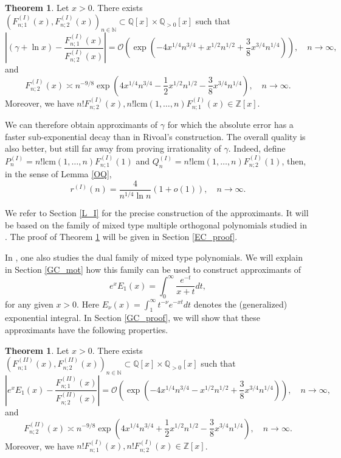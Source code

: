 \documentclass[a4paper,12pt,oneside]{article}
\theoremstyle{definition}
\newtheorem{thm}[defi]{Theorem} %
\newcommand{\N}{\mathbb{N}}
\newcommand{\Z}{\mathbb{Z}}
\newcommand{\Q}{\mathbb{Q}}
\newcommand{\BO}{\mathcal{O}}
\begin{document}
\begin{thm} \label{Res_EC}
    Let $x>0$. There exists $(F_{n;1}^{(I)}(x),F_{n;2}^{(I)}(x))_{n\in\N} \subset \Q[x]\times\Q_{>0}[x]$ such that
        $$ \left| (\gamma + \ln x) - \frac{F_{n;1}^{(I)}(x)}{F_{n;2}^{(I)}(x)}\right| = \BO (\exp(-4x^{1/4}n^{3/4} + x^{1/2} n^{1/2} + \frac{3}{8} x^{3/4} n^{1/4})),\quad n\to\infty, $$
    and 
        $$F_{n;2}^{(I)}(x) \asymp n^{-9/8} \exp(4x^{1/4}n^{3/4} - \frac{1}{2} x^{1/2}n^{1/2} - \frac{3}{8} x^{3/4} n^{1/4}),\quad n\to\infty.$$
    Moreover, we have $n! F_{n;2}^{(I)}(x), n!\text{lcm}(1,\dots,n) F_{n;1}^{(I)}(x)\in\Z[x] $.
\end{thm}

We can therefore obtain approximants of $\gamma$ for which the absolute error has a faster sub-exponential decay than in Rivoal's construction. The overall quality is also better, but still far away from proving irrationality of $\gamma$. Indeed, define $P_n^{(I)}=n!\text{lcm}(1,\dots,n) F_{n;1}^{(I)}(1)$ and $Q_n^{(I)} =n!\text{lcm}(1,\dots,n) F_{n;2}^{(I)}(1) $, then, in the sense of Lemma \ref{OQ},
    $$ r^{(I)}(n) = \frac{4}{n^{1/4}\ln n} (1+o(1)),\quad n\to\infty. $$

We refer to Section \ref{L_I} for the precise construction of the approximants. It will be based on the family of mixed type multiple orthogonal polynomials studied in \cite[Section 4.2]{VAWolfs}. The proof of Theorem \ref{Res_EC} will be given in Section \ref{EC_proof}.
\medbreak

In \cite[Section 4.1]{VAWolfs}, one also studies the dual family of mixed type polynomials. We will explain in Section \ref{GC_mot} how this family can be used to construct approximants of 
$$e^{x}E_1(x) = \int_0^\infty \frac{e^{-t}}{x+t} dt,$$
for any given $x>0$. Here $E_{\nu}(x) = \int_1^\infty t^{-\nu} e^{-xt} dt $ denotes the (generalized) exponential integral. In Section \ref{GC_proof}, we will show that these approximants have the following properties.

\begin{thm} \label{Res_GC}
    Let $x>0$. There exists $(F_{n;1}^{(II)}(x),F_{n;2}^{(II)}(x))_{n\in\N} \subset \Q[x]\times\Q_{>0}[x]$ such that
        $$ \left| e^{x}E_1(x) - \frac{F_{n;1}^{(II)}(x)}{F_{n;2}^{(II)}(x)}\right| = \BO(\exp(-4x^{1/4}n^{3/4} - x^{1/2}n^{1/2} + \frac{3}{8} x^{3/4} n^{1/4})),\quad n\to\infty,$$
    and
        $$F_{n;2}^{(II)}(x) \asymp n^{-9/8} \exp(4x^{1/4}n^{3/4} + \frac{1}{2} x^{1/2}n^{1/2} - \frac{3}{8} x^{3/4} n^{1/4}),\quad n\to\infty.$$
    Moreover, we have $n! F_{n;1}^{(I)}(x), n!F_{n;2}^{(I)}(x)\in\Z[x] $.
\end{thm}
\end{document}
